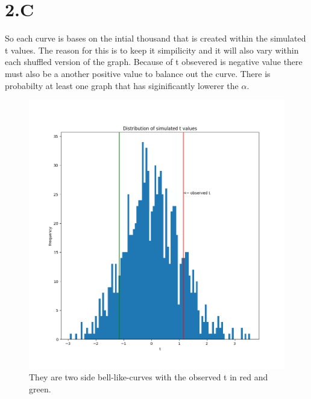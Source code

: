 \documentclass[12pt]{article}
\begin{document}
\part{2.C}
    So each curve is bases on the intial thousand that is created within the simulated t values. The reason for this is to keep it simpilicity and it will also vary within each shuffled version of the graph. Because of t obsevered is negative value there must also be a another positive value to balance out the curve. There is probabilty at least one graph that has siginificantly lowerer the $\alpha$.
                  \begin{figure}
                  \includegraphics[width=\linewidth]{./Figure-1.png}
                  \caption{They are two side bell-like-curves with the observed t in red and green.}
                  \label{fig:graph1}
                  \end{figure}
\end{document}
